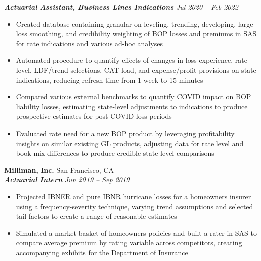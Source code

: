 \documentclass[11pt,letterpaper]{article}
\newcommand{\smallspace}{\vspace{6pt}}
\begin{document}
\textbf{\textit{Actuarial Assistant, Business Lines Indications}} \hfill \textit{Jul 2020 -- Feb 2022}
\begin{itemize}
	\item Created database containing granular on-leveling, trending, developing, large loss smoothing, and credibility weighting of BOP losses and premiums in SAS for rate indications and various ad-hoc analyses
	\item Automated procedure to quantify effects of changes in loss experience, rate level, LDF/trend selections, CAT load, and expense/profit provisions on state indications, reducing refresh time from 1 week to 15 minutes
	\item Compared various external benchmarks to quantify COVID impact on BOP liability losses, estimating state-level adjustments to indications to produce prospective estimates for post-COVID loss periods
	\item Evaluated rate need for a new BOP product by leveraging profitability insights on similar existing GL products, adjusting data for rate level and book-mix differences to produce credible state-level comparisons
\end{itemize}
\smallspace
\textbf{Milliman, Inc.} \hfill San Francisco, CA \\
\textbf{\textit{Actuarial Intern}} \hfill \textit{Jun 2019 -- Sep 2019}
\begin{itemize}
	\item Projected IBNER and pure IBNR hurricane losses for a homeowners insurer using a frequency-severity technique, varying trend assumptions and selected tail factors to create a range of reasonable estimates
	\item Simulated a market basket of homeowners policies and built a rater in SAS to compare average premium by rating variable across competitors, creating accompanying exhibits for the Department of Insurance
\end{itemize}
\end{document}
